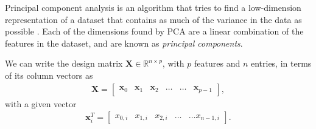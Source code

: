 Principal component analysis is an algorithm that tries to find a low-dimension representation of a dataset that contains as much of the variance in the data as possible \cite{Murphy2012, James2017}. Each of the dimensions found by PCA are a linear combination of the features in the dataset, and are known as \textit{principal components}.

We can write the design matrix $\boldsymbol{X}\in {\mathbb{R}}^{n\times p}$, with $p$ features and $n$ entries, in terms of its column vectors as
\begin{align}
\boldsymbol{X}=\begin{bmatrix} \boldsymbol{x}_0 & \boldsymbol{x}_1 & \boldsymbol{x}_2 & \dots & \dots & \boldsymbol{x}_{p-1}\end{bmatrix},
\label{eq:designmatrix}
\end{align}
with a given vector
\begin{align}
\boldsymbol{x}_i^T = \begin{bmatrix}x_{0,i} & x_{1,i} & x_{2,i}& \dots & \dots x_{n-1,i}\end{bmatrix}.
\label{eq:pc}
\end{align}

